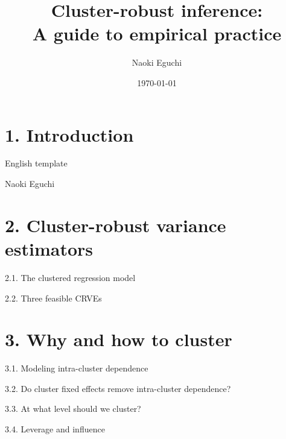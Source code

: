 \documentclass[xcolor=svgnames,aspectratio=169]{beamer}
\begin{document}
 

\title{Cluster-robust inference:\\ \small{A guide to empirical practice}}
\author{Naoki Eguchi}          
\date{\today}

\begin{frame}                  
    \titlepage                     
\end{frame}

\section{1. Introduction}

\begin{frame}{English template}
\begin{definition}[name]
Naoki Eguchi
\end{definition}
\end{frame}

\section{2. Cluster-robust variance estimators}

\begin{frame}{2.1. The clustered regression model}
\end{frame}

\begin{frame}{2.2. Three feasible CRVEs}
\end{frame}

\section{3. Why and how to cluster}

\begin{frame}{3.1. Modeling intra-cluster dependence}
\end{frame}

\begin{frame}{3.2. Do cluster fixed effects remove intra-cluster dependence?}
\end{frame}

\begin{frame}{3.3. At what level should we cluster?}
\end{frame}

\begin{frame}{3.4. Leverage and influence}
\end{frame}
\end{document}
